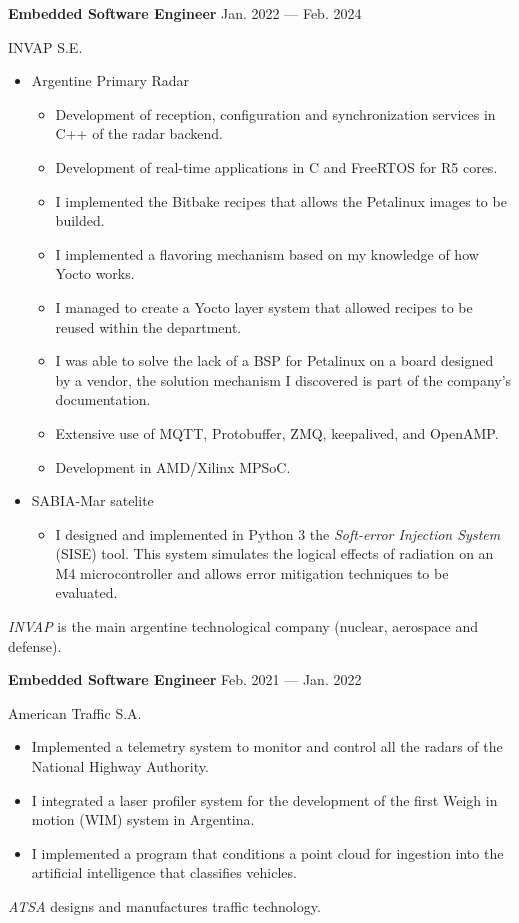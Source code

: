 \bigskip
\parbox[t][][t]{\linewidth}{
	\parbox{\linewidth}{
		\textbf{Embedded Software Engineer}
			\hfill
			{Jan. 2022 --- Feb. 2024}
		}
	\smallbreak
	\parbox{\linewidth}{INVAP S.E.}
	\smallbreak
	\begin{itemize}
		\item{Argentine Primary Radar}
		\begin{itemize}
			\item{Development of reception, configuration and synchronization services in C++ of the radar backend.}
			\item{Development of real-time applications in C and FreeRTOS for R5 cores.}
			\item{I implemented the Bitbake recipes that allows the Petalinux images to be builded.}
			\item{I implemented a flavoring mechanism based on my knowledge of how Yocto works.}
			\item{I managed to create a Yocto layer system that allowed recipes to be reused within the department.}
			\item{I was able to solve the lack of a BSP for Petalinux on a board designed by a vendor, the solution mechanism I discovered is part of the company's documentation.}
			\item{Extensive use of MQTT, Protobuffer, ZMQ, keepalived, and OpenAMP.}
			\item{Development in AMD/Xilinx MPSoC.}
		\end{itemize}
		\item{SABIA-Mar satelite}
		\begin{itemize}
			\item{I designed and implemented in Python 3 the \emph{Soft-error Injection System} (SISE) tool. This system simulates the logical effects of radiation on an M4 microcontroller and allows error mitigation techniques to be evaluated.}
		\end{itemize}
	\end{itemize}
	\smallbreak
    \emph{INVAP} is the main argentine technological company (nuclear, aerospace and defense).
}

\bigskip
\parbox[t][][t]{\linewidth}{
	\parbox{\linewidth}{
		\textbf{Embedded Software Engineer}
			\hfill
			{Feb. 2021 --- Jan. 2022}
		}
	\smallbreak
	\parbox{\linewidth}{American Traffic S.A.}
	\smallbreak
	\begin{itemize}
	    \item{Implemented a telemetry system to monitor and control all the radars of the National Highway Authority.}
	    \item{I integrated a laser profiler system for the development of the first Weigh in motion (WIM) system in Argentina.}
		\item{I implemented a program that conditions a point cloud for ingestion into the artificial intelligence that classifies vehicles.}
	\end{itemize}
	\smallbreak
    \emph{ATSA} designs and manufactures traffic technology.
}

